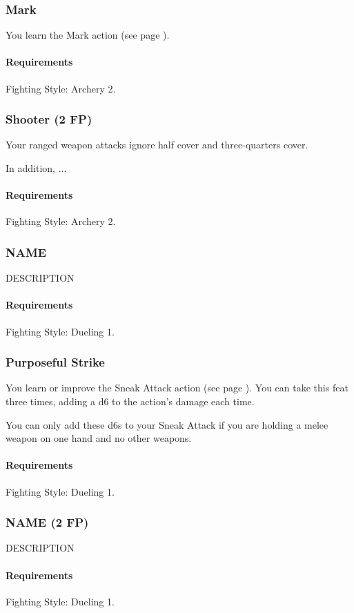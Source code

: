 \subsubsection{Mark} \label{feat::mark}
    You learn the Mark action (see page \pageref{act::mark}).
    \paragraph{Requirements} Fighting Style: Archery 2.
\subsubsection{Shooter (2 FP)} \label{feat::name}
    Your ranged weapon attacks ignore half cover and three-quarters cover.

    In addition, ...
    \paragraph{Requirements} Fighting Style: Archery 2.
\subsubsection{NAME} \label{feat::name}
    DESCRIPTION
    \paragraph{Requirements} Fighting Style: Dueling 1.
\subsubsection{Purposeful Strike} \label{feat::purposefulstrike}
    You learn or improve the Sneak Attack action (see page \pageref{act:sneakattack}).
    You can take this feat three times, adding a d6 to the action's damage each time.

    You can only add these d6s to your Sneak Attack if you are holding a melee weapon on one hand and no other weapons.
    \paragraph{Requirements} Fighting Style: Dueling 1.
\subsubsection{NAME (2 FP)} \label{feat::name}
    DESCRIPTION
    \paragraph{Requirements} Fighting Style: Dueling 1.
